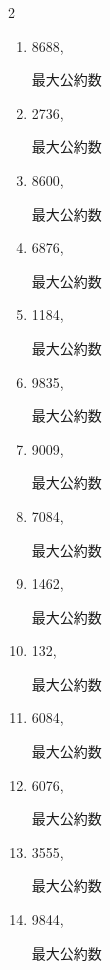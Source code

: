 \begin{multicols}{2}
\begin{enumerate}
  \itemsep=100pt
  \item 8688,

        最大公約数

  \item 2736,

        最大公約数

  \item 8600,

        最大公約数

  \item 6876,

        最大公約数

  \item 1184,

        最大公約数

\columnbreak %

  \item 9835,

        最大公約数

  \item 9009,

        最大公約数

  \item 7084,

        最大公約数

  \item 1462,

        最大公約数

  \item 132,

        最大公約数

\columnbreak %

\resetques

  \item 6084,

        最大公約数

  \item 6076,

        最大公約数

  \item 3555,

        最大公約数

  \item 9844,

        最大公約数


\end{enumerate}
\end{multicols}
